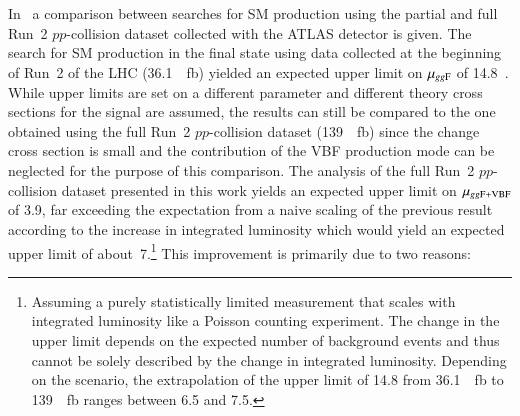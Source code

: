 In~ a comparison
between searches for SM \HH production using the partial and full
Run~2 $pp$-collision dataset collected with the ATLAS detector is
given. The search for SM \HH production in the \bbtautau final state
using data collected at the beginning of Run~2 of the LHC
(\SI{36.1}{\per\femto\barn}) yielded an expected upper limit on
$\mu_{gg\text{F}}$ of 14.8~\cite{HIGG-2016-16-witherratum}. While upper
limits are set on a different parameter and different theory cross
sections for the signal are assumed, the results can still be compared
to the one obtained using the full Run~2 $pp$-collision dataset
(\SI{139}{\per\femto\barn}) since the change cross section is small
and the contribution of the VBF production mode can be neglected for
the purpose of this comparison. The analysis of the full Run~2
$pp$-collision dataset presented in this work yields an expected upper
limit on $\mu_{gg\text{F}+\text{VBF}}$ of 3.9, far exceeding the expectation
from a naive scaling of the previous result according to the increase
in integrated luminosity which would yield an expected upper limit of
about~7.\footnote{Assuming a purely statistically limited measurement
  that scales with integrated luminosity like a Poisson counting
  experiment. The change in the upper limit depends on the expected
  number of background events and thus cannot be solely described by
  the change in integrated luminosity. Depending on the scenario, the
  extrapolation of the upper limit of \num{14.8} from
  \SI{36.1}{\per\femto\barn} to \SI{139}{\per\femto\barn} ranges
  between \num{6.5} and \num{7.5}.}  This improvement is primarily due
to two reasons:
